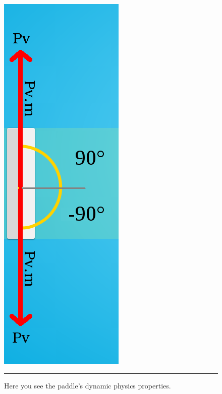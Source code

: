 \begin{figure}[htbp]
  \centering
  \includegraphics[scale=0.3]{../Figures/Chapter3/paddle.png}\\
  \rule{35em}{0.5pt}
  \caption[SimPL Paddle]{Here you see the paddle's dynamic physics properties.}
  \label{fig:paddle}
\end{figure}

